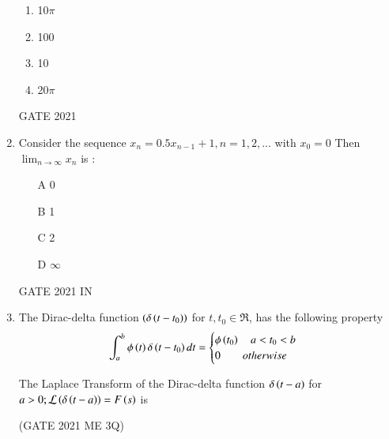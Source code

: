 \begin{enumerate}[label=\thechapter.\arabic*,ref=\thechapter.\theenumi]
\begin{enumerate}[label = \brak{\Alph*}]
\item 10$\pi$ \\
\item 100 \\
\item 10 \\
\item 20$\pi$ 
\end{enumerate}
\hfill GATE 2021\\
\solution

\item Consider the sequence $ x_n = 0.5x_{n-1} + 1 , n = 1,2,...$ with $x_0 = 0$ Then $ \lim_{n \to \infty} x_n$ is :
\begin{enumerate}
\item[A]0
\item[B]1
\item[C]2
\item[D]$\infty$
\end{enumerate}
\hfill {GATE 2021 IN}\\
\solution

\item The Dirac-delta function $\left(\delta\left(t - t_0\right)\right)$ for $t, t_0 \in \Re$, has the following property
\pagebreak
\begin{align}
    \int_{a}^{b}\phi\left(t\right)\delta\left(t - t_0\right)dt = 
    \begin{cases}
        \phi\left(t_0\right)\quad a < t_0 < b\\
        0 \quad\quad otherwise
    \end{cases} \label{eq:2022.ME.3.1}
\end{align}

The Laplace Transform of the Dirac-delta function $\delta\left(t - a\right)$ for $a > 0; \mathcal{L}\left(\delta\left(t - a\right)\right) = F\left(s\right)$ is

\hfill{(GATE 2021 ME 3Q)} \\
\solution

\end{enumerate}
